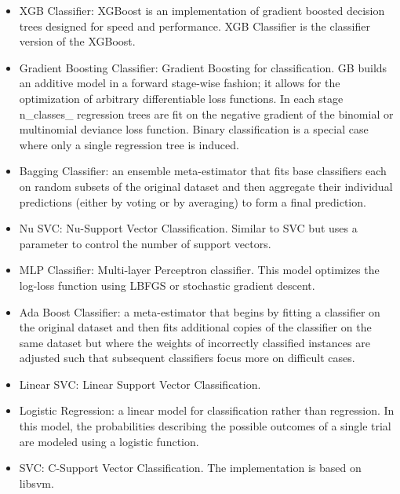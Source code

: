 \documentclass[a4paper]{article}
\begin{document}
			\begin{itemize}
				\item XGB Classifier: XGBoost is an implementation of gradient boosted decision trees designed for speed and performance. XGB Classifier is the classifier version of the XGBoost.		
				
				\item Gradient Boosting Classifier: Gradient Boosting for classification. GB builds an additive model in a forward stage-wise fashion; it allows for the optimization of arbitrary differentiable loss functions. In each stage n\_classes\_ regression trees are fit on the negative gradient of the binomial or multinomial deviance loss function. Binary classification is a special case where only a single regression tree is induced.
				
				\item Bagging Classifier: an ensemble meta-estimator that fits base classifiers each on random subsets of the original dataset and then aggregate their individual predictions (either by voting or by averaging) to form a final prediction.
				
				\item Nu SVC: Nu-Support Vector Classification. Similar to SVC but uses a parameter to control the number of support vectors.
				
				\item MLP Classifier: Multi-layer Perceptron classifier. This model optimizes the log-loss function using LBFGS or stochastic gradient descent.
				
				\item Ada Boost Classifier: a meta-estimator that begins by fitting a classifier on the original dataset and then fits additional copies of the classifier on the same dataset but where the weights of incorrectly classified instances are adjusted such that subsequent classifiers focus more on difficult cases.
				
				\item Linear SVC: Linear Support Vector Classification.
				
				\item Logistic Regression: a linear model for classification rather than regression. In this model, the probabilities describing the possible outcomes of a single trial are modeled using a logistic function.
				
				\item SVC: C-Support Vector Classification.	The implementation is based on libsvm.
				

\end{itemize}
\end{document}
